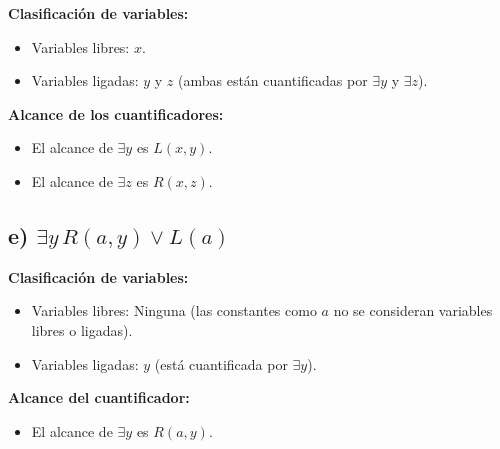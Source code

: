 \documentclass[11pt,letterpaper]{article}
\begin{document}
\textbf{Clasificación de variables:}
\begin{itemize}
    \item Variables libres: \( x \).
    \item Variables ligadas: \( y \) y \( z \) (ambas están cuantificadas por \( \exists y \) y \( \exists z \)).
\end{itemize}

\textbf{Alcance de los cuantificadores:}
\begin{itemize}
    \item El alcance de \( \exists y \) es \( L(x, y) \).
    \item El alcance de \( \exists z \) es \( R(x, z) \).
\end{itemize}

\subsection*{e) \( \exists y \, R(a, y) \lor L(a) \)}

\textbf{Clasificación de variables:}
\begin{itemize}
    \item Variables libres: Ninguna (las constantes como \( a \) no se consideran variables libres o ligadas).
    \item Variables ligadas: \( y \) (está cuantificada por \( \exists y \)).
\end{itemize}

\textbf{Alcance del cuantificador:}
\begin{itemize}
    \item El alcance de \( \exists y \) es \( R(a, y) \).
\end{itemize}











\end{document}
